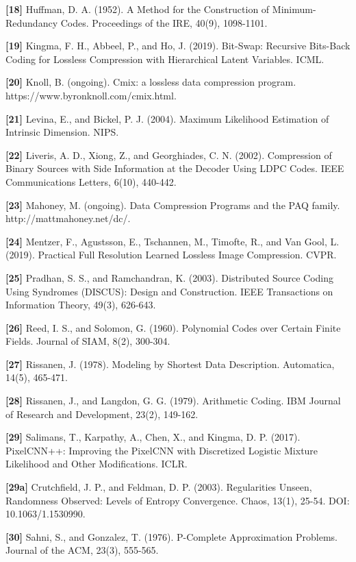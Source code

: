 \documentclass[
]{article}
\begin{document}
\textbf{{[}18{]}} Huffman, D. A. (1952). A Method for the Construction
of Minimum-Redundancy Codes. Proceedings of the IRE, 40(9), 1098-1101.

\textbf{{[}19{]}} Kingma, F. H., Abbeel, P., and Ho, J. (2019).
Bit-Swap: Recursive Bits-Back Coding for Lossless Compression with
Hierarchical Latent Variables. ICML.

\textbf{{[}20{]}} Knoll, B. (ongoing). Cmix: a lossless data compression
program. https://www.byronknoll.com/cmix.html.

\textbf{{[}21{]}} Levina, E., and Bickel, P. J. (2004). Maximum
Likelihood Estimation of Intrinsic Dimension. NIPS.

\textbf{{[}22{]}} Liveris, A. D., Xiong, Z., and Georghiades, C. N.
(2002). Compression of Binary Sources with Side Information at the
Decoder Using LDPC Codes. IEEE Communications Letters, 6(10), 440-442.

\textbf{{[}23{]}} Mahoney, M. (ongoing). Data Compression Programs and
the PAQ family. http://mattmahoney.net/dc/.

\textbf{{[}24{]}} Mentzer, F., Agustsson, E., Tschannen, M., Timofte,
R., and Van Gool, L. (2019). Practical Full Resolution Learned Lossless
Image Compression. CVPR.

\textbf{{[}25{]}} Pradhan, S. S., and Ramchandran, K. (2003).
Distributed Source Coding Using Syndromes (DISCUS): Design and
Construction. IEEE Transactions on Information Theory, 49(3), 626-643.

\textbf{{[}26{]}} Reed, I. S., and Solomon, G. (1960). Polynomial Codes
over Certain Finite Fields. Journal of SIAM, 8(2), 300-304.

\textbf{{[}27{]}} Rissanen, J. (1978). Modeling by Shortest Data
Description. Automatica, 14(5), 465-471.

\textbf{{[}28{]}} Rissanen, J., and Langdon, G. G. (1979). Arithmetic
Coding. IBM Journal of Research and Development, 23(2), 149-162.

\textbf{{[}29{]}} Salimans, T., Karpathy, A., Chen, X., and Kingma, D.
P. (2017). PixelCNN++: Improving the PixelCNN with Discretized Logistic
Mixture Likelihood and Other Modifications. ICLR.

\textbf{{[}29a{]}} Crutchfield, J. P., and Feldman, D. P. (2003).
Regularities Unseen, Randomness Observed: Levels of Entropy
Convergence. Chaos, 13(1), 25-54. DOI: 10.1063/1.1530990.

\textbf{{[}30{]}} Sahni, S., and Gonzalez, T. (1976). P-Complete
Approximation Problems. Journal of the ACM, 23(3), 555-565.
\end{document}
